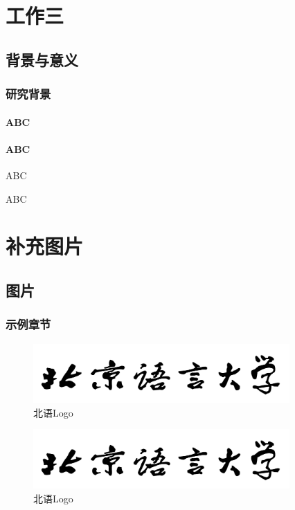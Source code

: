 \documentclass[doctor,final,twoside]{blcuthesis}
\begin{document}
	\chapter{工作三}
	\section{背景与意义}
	\subsection{研究背景}
	\subsubsection{ABC}
	\subsubsection{ABC}
	ABC\citet{Xiang:20}
	
	ABC\citep{Xiang:20}
	
	\nocite{*}
	
	
	
	\appendix
	
	\chapter{补充图片}
	\section{图片}
	\subsection{示例章节}
	\begin{figure}[h]
		\centering
		\includegraphics[width=9.8cm]{figures/BLCULogoText.png}
		\caption{北语Logo}
	\end{figure}
	
	\begin{figure}[h]
		\centering
		\includegraphics[width=9.8cm]{figures/BLCULogoText.png}
		\caption{北语Logo}
	\end{figure}
\end{document}

